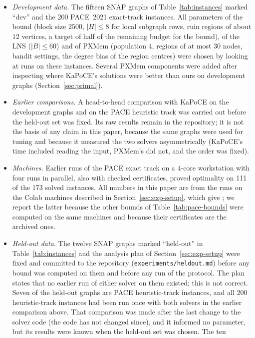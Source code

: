 \begin{itemize}
\item \emph{Development data.}  The fifteen SNAP graphs of
Table~\ref{tab:instances} marked ``dev'' and the 200 PACE~2021 exact-track
instances.  All parameters of the bound (block size $2500$, $|H|\le8$ for local
subgraph rows, ruin regions of about $12$ vertices, a target of half of the
remaining budget for the bound), of the LNS ($|B|\le60$) and of PXMem (population $4$, regions of at
most $30$ nodes, bandit settings, the degree bias of the region centres)
were chosen by looking at runs on these instances.  Several PXMem components
were added after inspecting where KaPoCE's solutions were better than ours on
development graphs (Section~\ref{sec:primal}).
\item \emph{Earlier comparisons.}  A head-to-head comparison with KaPoCE on
the development graphs and on the PACE heuristic track was carried out before
the held-out set was fixed.  Its raw results remain in the repository; it is
not the basis of any claim in this paper, because the same graphs were used
for tuning and because it measured the two solvers asymmetrically (KaPoCE's
time included reading the input, PXMem's did not, and the order was fixed).
\item \emph{Machines.}  Earlier runs of the PACE exact track on a 4-core
workstation with four runs in parallel, also with checked certificates,
proved optimality on 111 of the 173 solved instances.  All numbers in this
paper are from the runs on the Colab machines described in
Section~\ref{sec:exp-setup}, which give \numPaceOptOurs{}; we report the
latter because the other bounds of Table~\ref{tab:pace-bounds} were computed
on the same machines and because their certificates are the archived ones.
\item \emph{Held-out data.}  The twelve SNAP graphs marked ``held-out'' in
Table~\ref{tab:instances} and the analysis plan of
Section~\ref{sec:exp-setup} were fixed and committed to the repository
(\texttt{experiments/heldout.md}) before any bound was computed on them and
before any run of the protocol.  The plan states that no earlier run of
either solver on them existed; this is not correct.  Seven of the held-out
graphs are PACE heuristic-track instances, and all 200 heuristic-track
instances had been run once with both solvers in the earlier comparison
above.  That comparison was made after the last change to the solver code
(the code has not changed since), and it informed no parameter, but its
results were known when the held-out set was chosen.  The ten

\end{itemize}
